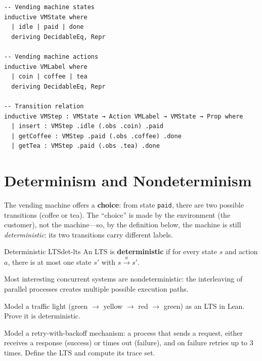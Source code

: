 \documentclass[11pt, a4paper, oneside]{book}
\newcommand{\lc}[1]{\texttt{#1}}
\newcounter{exercise}[chapter]
\begin{document}
\begin{leanbox}
\begin{verbatim}
-- Vending machine states
inductive VMState where
  | idle | paid | done
  deriving DecidableEq, Repr

-- Vending machine actions
inductive VMLabel where
  | coin | coffee | tea
  deriving DecidableEq, Repr

-- Transition relation
inductive VMStep : VMState → Action VMLabel → VMState → Prop where
  | insert : VMStep .idle (.obs .coin) .paid
  | getCoffee : VMStep .paid (.obs .coffee) .done
  | getTea : VMStep .paid (.obs .tea) .done
\end{verbatim}
\end{leanbox}

\section{Determinism and Nondeterminism}

The vending machine offers a \textbf{choice}: from state \lc{paid},
there are two possible transitions (coffee or tea). The ``choice'' is made
by the environment (the customer), not the machine---so, by the definition
below, the machine is still \emph{deterministic}: its two transitions carry
different labels.

\begin{defn}{Deterministic LTS}{det-lts}
An LTS is \textbf{deterministic} if for every state $s$ and action $a$,
there is at most one state $s'$ with $s \xrightarrow{a} s'$.
\end{defn}

Most interesting concurrent systems are nondeterministic: the interleaving
of parallel processes creates multiple possible execution paths.

\begin{exercisebox}[title={Exercise 2.1}]
Model a traffic light (green $\to$ yellow $\to$ red $\to$ green) as an LTS
in Lean. Prove it is deterministic.
\end{exercisebox}

\begin{exercisebox}[title={Exercise 2.2}]
Model a retry-with-backoff mechanism: a process that sends a request, either
receives a response (success) or times out (failure), and on failure retries
up to 3 times. Define the LTS and compute its trace set.
\end{exercisebox}

\end{document}
